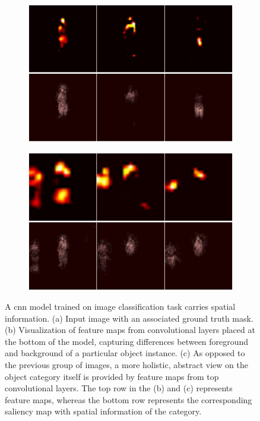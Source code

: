 \begin{figure}[t]
\begin{subfigure}[b]{0.13\textwidth}
        \caption[]{}
    \end{subfigure}
    \hfill
    \begin{subfigure}[b]{0.39\textwidth}
        \centering
        \includegraphics[width=\textwidth]{figures/theoretical_foundations/fully_cnn_tracking_feature_maps_2.pdf}
        \caption[]{}
    \end{subfigure}
    \hfill
    \begin{subfigure}[b]{0.39\textwidth}
        \centering
        \includegraphics[width=\textwidth]{figures/theoretical_foundations/fully_cnn_tracking_feature_maps_3.pdf}
        \caption[]{}
    \end{subfigure}
    \caption[Fully convolutional tracking]{A \gls{cnn} model trained on image classification task carries spatial information. (a) Input image with an associated ground truth mask. (b) Visualization of feature maps from convolutional layers placed at the bottom of the model, capturing differences between foreground and background of a particular object instance. (c) As opposed to the previous group of images, a more holistic, abstract view on the object category itself is provided by feature maps from top convolutional layers. The top row in the (b) and (c) represents feature maps, whereas the bottom row represents the corresponding saliency map with spatial information of the category. }
    \label{fig:FullyCNNTrackingFeatureMaps}
\end{figure}

